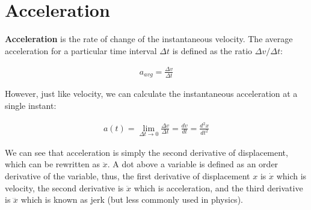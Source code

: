 \documentclass[11pt]{article}
\begin{document}
\begin{center}
\end{center}

\section{Acceleration}

\textbf{Acceleration} is the rate of change of the instantaneous velocity. The average acceleration for a particular time interval $\Delta t$ is defined as the ratio $\Delta v / \Delta t$:

\begin{align*}
    a_{avg} = \frac{\Delta v}{\Delta t}
\end{align*}

However, just like velocity, we can calculate the instantaneous acceleration at a single instant:

\begin{align*}
    a(t) = \lim_{\Delta t \to 0}\frac{\Delta v}{\Delta t} = \frac{dv}{dt} = \frac{d^{2}x}{dt^{2}}
\end{align*}

We can see that acceleration is simply the second derivative of displacement, which can be rewritten as $\ddot{x}$. A dot above a variable is defined as an order derivative of the variable, thus, the first derivative of displacement $x$ is $\dot{x}$ which is velocity, the second derivative is $\ddot{x}$ which is acceleration, and the third derivative is $\dddot{x}$ which is known as jerk (but less commonly used in physics).
\end{document}
